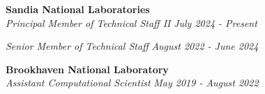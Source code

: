 \newcommand{\myExpFour}{
\item Conducted research and development for User-defined Loop Schedules (UDS) in OpenMP.
\item Integrated OpenMP UDS loop scheduling strategies into Charm++'s CkLoop. 
}

\textbf{Sandia National Laboratories}\\
\textit{Principal Member of Technical Staff II} \hfill \textit{July 2024 - Present}
\noindent
\begin{itemize}\onlyitems[include={1,2}]
\myExpOne
\end{itemize}

\noindent
\textit{Senior Member of Technical Staff} \hfill \textit{August 2022 - June 2024}
\begin{itemize}
\myExpTwo 
\end{itemize} 
\textbf{Brookhaven National Laboratory}\\
\textit{Assistant Computational Scientist} \hfill \textit{May 2019 - August 2022}
\begin{itemize}
\myExpThree
\end{itemize}
